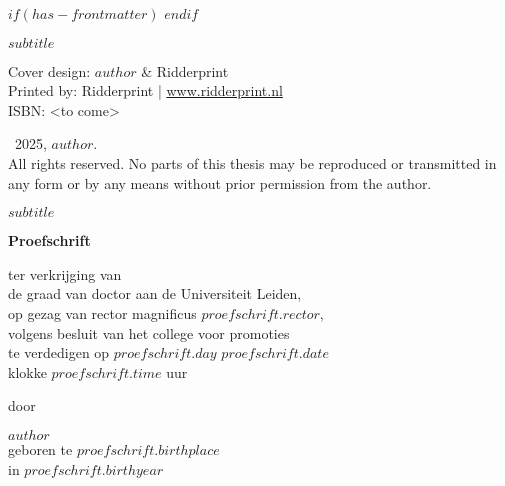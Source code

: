 
$if(has-frontmatter)$
\frontmatter
$endif$


\begin{titlepage}
  \hspace{0pt}
  \vfill
  \begin{center}
     \par %
    \smallskip
    \textsf{\Large $subtitle$} \par
    \vfill
  \end{center}
\end{titlepage}


\clearpage
\thispagestyle{empty}
\vspace*{\fill} %

\begingroup
  \setlength{\parskip}{\baselineskip}
  \begin{flushleft}
    Cover design: $author$ \& Ridderprint \\
    Printed by: Ridderprint | \href{www.ridderprint.nl}{www.ridderprint.nl} \\
    ISBN: <to come>\par

    \textcopyright \ 2025, $author$. \\
    All rights reserved. No parts of this thesis may be reproduced or transmitted in any form or by any means without prior permission from the author.
  \end{flushleft}
\endgroup


\clearpage
\thispagestyle{empty}

\begin{center}
   \par %
  \smallskip
  \textsf{\Large $subtitle$} \par
  \vfill
  \textbf{\large Proefschrift} \par
  \vspace{2\baselineskip}
  \large{
    ter verkrijging van \\
    de graad van doctor aan de Universiteit Leiden, \\
    op gezag van rector magnificus $proefschrift.rector$, \\
    volgens besluit van het college voor promoties \\
    te verdedigen op $proefschrift.day$ $proefschrift.date$ \\
    klokke $proefschrift.time$ uur
  } \par
  \vspace{2\baselineskip}
  \large{door} \par
  \vspace{2\baselineskip}
  \large{$author$} \\
  \normalsize{geboren te $proefschrift.birthplace$\\in $proefschrift.birthyear$} \par
\end{center}


